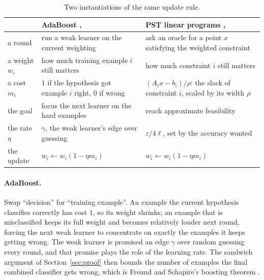 \documentclass[11pt,a4paper]{article}
\theoremstyle{plain}
\theoremstyle{definition}
\begin{document}
\begin{table}[htbp]
\centering
\small
\renewcommand{\arraystretch}{1.2}
\begin{tabular}{@{}>{\raggedright\arraybackslash}p{2.1cm}>{\raggedright\arraybackslash}p{5.7cm}>{\raggedright\arraybackslash}p{6.6cm}@{}}
\toprule
 & \textbf{AdaBoost} \cite{FS97}, \cite[Section~3.6]{AHK12} & \textbf{PST linear programs} \cite{PST95}, \cite[Section~3.3]{AHK12}\\
\midrule
a round     & run a weak learner on the current weighting & ask an oracle for a point $x$ satisfying the weighted constraint\\
a weight $w_i$ & how much training example $i$ still matters & how much constraint $i$ still matters\\
a cost $m_i$ & $1$ if the hypothesis got example $i$ right, $0$ if wrong & $(A_i x - b_i)/\rho$: the slack of constraint $i$, scaled by its width $\rho$\\
the goal    & focus the next learner on the hard examples & reach approximate feasibility\\
the rate $\eta$ & $\gamma$, the weak learner's edge over guessing & $\varepsilon/4\ell$, set by the accuracy wanted\\
the update  & $w_i \leftarrow w_i(1-\eta m_i)$ & $w_i \leftarrow w_i(1-\eta m_i)$\\
\bottomrule
\end{tabular}
\caption{Two instantiations of the same update rule.}
\label{tab:examples}
\end{table}

\paragraph{AdaBoost.}
Swap ``decision'' for ``training example''. An example the current hypothesis classifies correctly has cost $1$, so its weight shrinks; an example that is misclassified keeps its full weight and becomes relatively louder next round, forcing the next weak learner to concentrate on exactly the examples it keeps getting wrong. The weak learner is promised an edge $\gamma$ over random guessing every round, and that promise plays the role of the learning rate. The sandwich argument of Section~\ref{sec:proof} then bounds the number of examples the final combined classifier gets wrong, which is Freund and Schapire's boosting theorem \cite{FS97}.
\end{document}
